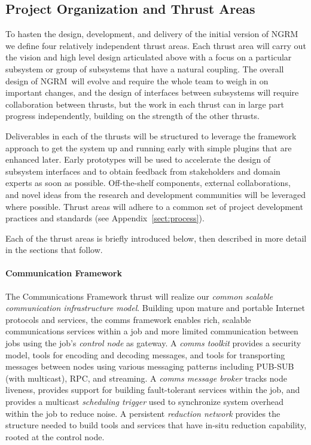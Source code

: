 \documentclass[10pt]{article}
\newcommand{\ngrm}{NGRM}
\begin{document}
\subsection{Project Organization and Thrust Areas}
\label{sect:projorg}
To hasten the design, development, and delivery of the initial version
of \ngrm\, we define four relatively independent thrust areas.
Each thrust area will carry out the vision and high level design articulated
above with a focus on a particular subsystem or group of subsystems that
have a natural coupling.  The overall design of \ngrm\ will evolve and
require the whole team to weigh in on important changes, and the design
of interfaces between subsystems will require collaboration between
thrusts, but the work in each thrust can in large part progress
independently, building on the strength of the other thrusts.

Deliverables in each of the thrusts will be structured 
to leverage the framework approach to get the system up and running
early with simple plugins that are enhanced later.
Early prototypes will be used to accelerate the design of subsystem
interfaces and to obtain feedback from stakeholders and domain experts
as soon as possible.
Off-the-shelf components, external collaborations, and novel ideas from
the research and development communities will be leveraged where possible.
Thrust areas will adhere to a common set of project development practices
and standards (see Appendix~\ref{sect:process}).

Each of the thrust areas is briefly introduced below, then described in
more detail in the sections that follow.

\paragraph{Communication Framework}
The Communications Framework thrust will
realize our {\em common scalable communication infrastructure model}.
Building upon mature and portable Internet protocols and services,
the comms framework enables rich, scalable communications services
within a job and more limited communication between jobs using
the job's {\em control node} as gateway.
A {\em comms toolkit} provides a security model, tools for
encoding and decoding messages, and tools for transporting messages between
nodes using various messaging patterns including PUB-SUB (with multicast),
RPC, and streaming.
A {\em comms message broker} tracks node liveness, provides support for
building fault-tolerant services within the job,
and provides a multicast {\em scheduling trigger} used to synchronize
system overhead within the job to reduce noise.
A persistent {\em reduction network}
provides the structure needed to build tools and services that have
in-situ reduction capability, rooted at the control node.
\end{document}
